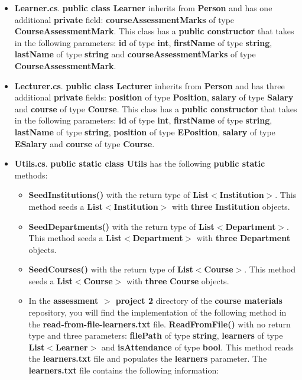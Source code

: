 \documentclass{article}
\begin{document}
\begin{itemize}
\begin{itemize}
        \item \textbf{Learner.cs}. \textbf{public class Learner} inherits from \textbf{Person} and has one additional \textbf{private} field: \textbf{courseAssessmentMarks} of type \textbf{CourseAssessmentMark}. This class has a \textbf{public constructor} that takes in the following parameters: \textbf{id} of type \textbf{int}, \textbf{firstName} of type \textbf{string}, \textbf{lastName} of type \textbf{string} and \textbf{courseAssessmentMarks} of type \textbf{CourseAssessmentMark}. 
        \item \textbf{Lecturer.cs}. \textbf{public class Lecturer} inherits from \textbf{Person} and has three additional \textbf{private} fields: \textbf{position} of type \textbf{Position}, \textbf{salary} of type \textbf{Salary} and \textbf{course} of type \textbf{Course}. This class has a \textbf{public constructor} that takes in the following parameters: \textbf{id} of type \textbf{int}, \textbf{firstName} of type \textbf{string}, \textbf{lastName} of type \textbf{string}, \textbf{position} of type \textbf{EPosition}, \textbf{salary} of type \textbf{ESalary} and \textbf{course} of type \textbf{Course}.
        \item \textbf{Utils.cs}. \textbf{public static class Utils} has the following \textbf{public static} methods:
        \begin{itemize}
            \item \textbf{SeedInstitutions()} with the return type of \textbf{List$<$Institution$>$}. This method seeds a \textbf{List$<$Institution$>$} with \textbf{three} \textbf{Institution} objects.
            \item \textbf{SeedDepartments()} with the return type of \textbf{List$<$Department$>$}. This method seeds a \textbf{List$<$Department$>$} with \textbf{three} \textbf{Department} objects.
            \item \textbf{SeedCourses()} with the return type of \textbf{List$<$Course$>$}. This method seeds a \textbf{List$<$Course$>$} with \textbf{three} \textbf{Course} objects. 
            \item In the \textbf{assessment $>$ project 2} directory of the \textbf{course materials} repository, you will find the implementation of the following method in the \textbf{read-from-file-learners.txt} file.
            \textbf{ReadFromFile()} with no return type and three parameters: \textbf{filePath} of type \textbf{string}, \textbf{learners} of type \textbf{List$<$Learner$>$} and \textbf{isAttendance} of type \textbf{bool}. This method reads the \textbf{learners.txt} file and populates the \textbf{learners} parameter. The \textbf{learners.txt} file contains the following information:\\

\end{itemize}
\end{itemize}
\end{itemize}
\end{document}
